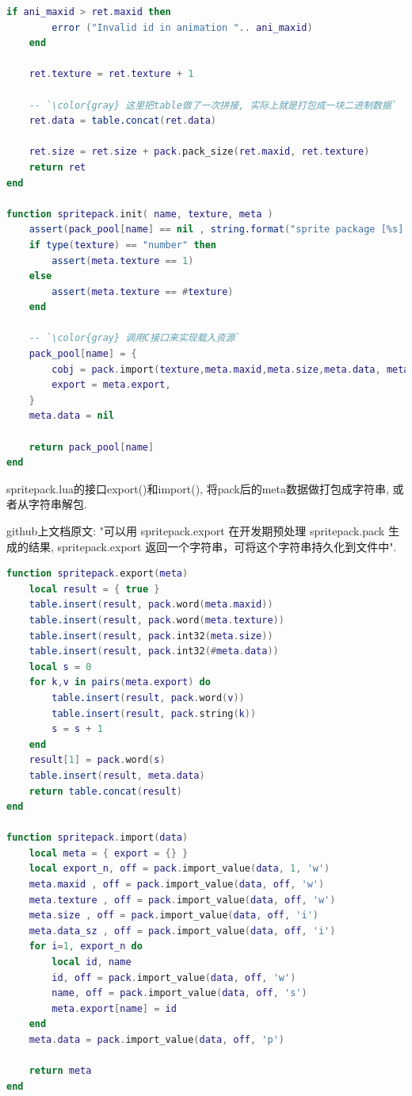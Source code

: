 \begin{lstlisting}[language=lua]
    if ani_maxid > ret.maxid then
        error ("Invalid id in animation ".. ani_maxid)
    end

    ret.texture = ret.texture + 1

    -- `\color{gray} 这里把table做了一次拼接, 实际上就是打包成一块二进制数据`
    ret.data = table.concat(ret.data)

    ret.size = ret.size + pack.pack_size(ret.maxid, ret.texture)
    return ret
end

function spritepack.init( name, texture, meta )
    assert(pack_pool[name] == nil , string.format("sprite package [%s] is exist", name))
    if type(texture) == "number" then
        assert(meta.texture == 1)
    else
        assert(meta.texture == #texture)
    end
    
    -- `\color{gray} 调用C接口来实现载入资源`
    pack_pool[name] = {
        cobj = pack.import(texture,meta.maxid,meta.size,meta.data, meta.data_sz),
        export = meta.export,
    }
    meta.data = nil

    return pack_pool[name]
end
\end{lstlisting}

{spritepack.lua的接口export()和import(), 将pack后的meta数据做打包成字符串, 或者从字符串解包.}\par
{github上文档原文: "可以用 spritepack.export 在开发期预处理 spritepack.pack 生成的结果, spritepack.export 返回一个字符串，可将这个字符串持久化到文件中". } \par

\begin{lstlisting}[language=lua]
function spritepack.export(meta)
    local result = { true }
    table.insert(result, pack.word(meta.maxid))
    table.insert(result, pack.word(meta.texture))
    table.insert(result, pack.int32(meta.size))
    table.insert(result, pack.int32(#meta.data))
    local s = 0
    for k,v in pairs(meta.export) do
        table.insert(result, pack.word(v))
        table.insert(result, pack.string(k))
        s = s + 1
    end
    result[1] = pack.word(s)
    table.insert(result, meta.data)
    return table.concat(result)
end

function spritepack.import(data)
    local meta = { export = {} }
    local export_n, off = pack.import_value(data, 1, 'w')
    meta.maxid , off = pack.import_value(data, off, 'w')
    meta.texture , off = pack.import_value(data, off, 'w')
    meta.size , off = pack.import_value(data, off, 'i')
    meta.data_sz , off = pack.import_value(data, off, 'i')
    for i=1, export_n do
        local id, name
        id, off = pack.import_value(data, off, 'w')
        name, off = pack.import_value(data, off, 's')
        meta.export[name] = id
    end
    meta.data = pack.import_value(data, off, 'p')

    return meta
end
\end{lstlisting}



